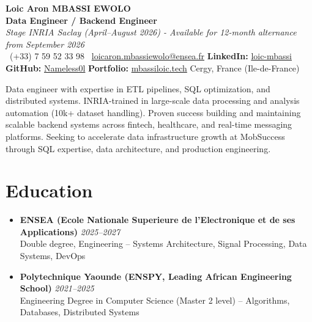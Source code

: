 \documentclass[a4paper,11pt]{article}
\begin{document}
\begin{center}
    {\Large \textbf{Loic Aron MBASSI EWOLO}} \\ \vspace{4pt}
    \textbf{\large Data Engineer / Backend Engineer} \\
    \textit{\small Stage INRIA Saclay (April--August 2026) - Available for 12-month alternance from September 2026} \\ \vspace{4pt}
    \small
    \Mobilefone\ (+33) 7 59 52 33 98 \quad
    \Letter\ \href{mailto:loicaron.mbassiewolo@ensea.fr}{loicaron.mbassiewolo@ensea.fr} \quad
    \textbf{LinkedIn:} \href{https://www.linkedin.com/in/loic-mbassi/}{loic-mbassi} \\ \vspace{2pt}
    \textbf{GitHub:} \href{https://github.com/Nameless0l}{Nameless0l} \quad
    \textbf{Portfolio:} \href{https://mbassiloic.tech}{mbassiloic.tech} \quad
    Cergy, France (Ile-de-France)
\end{center}

\vspace{-6pt}

\noindent\small{Data engineer with expertise in ETL pipelines, SQL optimization, and distributed systems. INRIA-trained in large-scale data processing and analysis automation (10k+ dataset handling). Proven success building and maintaining scalable backend systems across fintech, healthcare, and real-time messaging platforms. Seeking to accelerate data infrastructure growth at MobSuccess through SQL expertise, data architecture, and production engineering.}

\vspace{6pt}

\section{Education}
\begin{itemize}[leftmargin=*, label=\tiny$\bullet$, nosep]
    \item \textbf{ENSEA (Ecole Nationale Superieure de l'Electronique et de ses Applications)} \hfill \textit{2025--2027} \\
    \small{Double degree, Engineering -- Systems Architecture, Signal Processing, Data Systems, DevOps}
    \item \textbf{Polytechnique Yaounde (ENSPY, Leading African Engineering School)} \hfill \textit{2021--2025} \\
    \small{Engineering Degree in Computer Science (Master 2 level) -- Algorithms, Databases, Distributed Systems}
\end{itemize}
\end{document}
